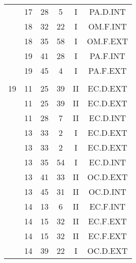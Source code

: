 \documentclass[12pt, a4paper]{article}
\begin{document}
\begin{multicols}{3}
{\begin{tabular}{c c c c c c}
	 	 	 	 & 17 & 28 & 5 & I & PA.D.INT\\%
	 	 	 	 & 18 & 32 & 22 & I & OM.F.INT\\%
	 	 	 	 & 18 & 35 & 58 & I & OM.F.EXT\\%
	 	 	 	 & 19 & 41 & 28 & I & PA.F.INT\\%
	 	 	 	 & 19 & 45 & 4 & I & PA.F.EXT\\%
	 	 	 	 & & & & & \\%
	 	 	 	19 & 11 & 25 & 39 & II & EC.D.EXT\\%
	 	 	 	 & 11 & 25 & 39 & II & EC.D.EXT\\%
	 	 	 	 & 11 & 28 & 7 & II & EC.D.INT\\%
	 	 	 	 & 13 & 33 & 2 & I & EC.D.EXT\\%
	 	 	 	 & 13 & 33 & 2 & I & EC.D.EXT\\%
	 	 	 	 & 13 & 35 & 54 & I & EC.D.INT\\%
	 	 	 	 & 13 & 41 & 33 & II & OC.D.EXT\\%
	 	 	 	 & 13 & 45 & 31 & II & OC.D.INT\\%
	 	 	 	 & 14 & 13 & 6 & II & EC.F.INT\\%
	 	 	 	 & 14 & 15 & 32 & II & EC.F.EXT\\%
	 	 	 	 & 14 & 15 & 32 & II & EC.F.EXT\\%
	 	 	 	 & 14 & 39 & 22 & I & OC.D.EXT\\%
	 	 \end{tabular}
 	}
\end{multicols}
\end{document}
